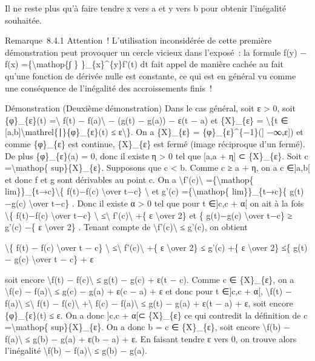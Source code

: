 \documentclass[]{article}
\begin{document}
Il ne reste plus qu'à faire tendre x vers a et y vers b pour obtenir
l'inégalité souhaitée.

Remarque~8.4.1 Attention~! L'utilisation inconsidérée de cette première
démonstration peut provoquer un cercle vicieux dans l'exposé~: la
formule f(y) − f(x) =\{\textbackslash{}mathop\{∫ \}
\}\_\{x\}\^{}\{y\}f'(t) dt fait appel de manière cachée au fait qu'une
fonction de dérivée nulle est constante, ce qui est en général vu comme
une conséquence de l'inégalité des accroissements finis~!

Démonstration (Deuxième démonstration) Dans le cas général, soit ε
\textgreater{} 0, soit \{φ\}\_\{ε\}(t) =\textbackslash{}\textbar{} f(t)
− f(a)\textbackslash{}\textbar{} − (g(t) − g(a)) − ε(t − a) et
\{X\}\_\{ε\} = \textbackslash{}\{t ∈
{[}a,b{]}\textbackslash{}mathrel\{∣\}\{φ\}\_\{ε\}(t) ≤
ε\textbackslash{}\}. On a \{X\}\_\{ε\} = \{φ\}\_\{ε\}\^{}\{−1\}({]}
−∞,ε{]}) et comme \{φ\}\_\{ε\} est continue, \{X\}\_\{ε\} est fermé
(image réciproque d'un fermé). De plus \{φ\}\_\{ε\}(a) = 0, donc il
existe η \textgreater{} 0 tel que {[}a,a + η{]} ⊂ \{X\}\_\{ε\}. Soit c
=\textbackslash{}mathop\{ sup\}\{X\}\_\{ε\}. Supposons que c \textless{}
b. Comme c ≥ a + η, on a c ∈{]}a,b{[} et donc f et g sont dérivables au
point c. On a \textbackslash{}\textbar{}f'(c)\textbackslash{}\textbar{}
=\{\textbackslash{}mathop\{ lim\}\}\_\{t→c\}\textbackslash{}\textbar{}\{
f(t)−f(c) \textbackslash{}over t−c\} \textbackslash{}\textbar{} et g'(c)
=\{\textbackslash{}mathop\{ lim\}\}\_\{t→c\}\{ g(t)−g(c)
\textbackslash{}over t−c\} . Donc il existe α \textgreater{} 0 tel que
pour t ∈{]}c,c + α{[} on ait à la fois \textbackslash{}\textbar{}\{
f(t)−f(c) \textbackslash{}over t−c\} \textbackslash{}\textbar{}
≤\textbackslash{}\textbar{} f'(c)\textbackslash{}\textbar{} +\{ ε
\textbackslash{}over 2\} et \{ g(t)−g(c) \textbackslash{}over t−c\} ≥
g'(c) −\{ ε \textbackslash{}over 2\} . Tenant compte de
\textbackslash{}\textbar{}f'(c)\textbackslash{}\textbar{} ≤ g'(c), on
obtient

\textbackslash{}\textbar{}\{ f(t) − f(c) \textbackslash{}over t − c\}
\textbackslash{}\textbar{} ≤\textbackslash{}\textbar{}
f'(c)\textbackslash{}\textbar{} +\{ ε \textbackslash{}over 2\} ≤ g'(c)
+\{ ε \textbackslash{}over 2\} ≤\{ g(t) − g(c) \textbackslash{}over t −
c\} + ε

soit encore \textbackslash{}\textbar{}f(t) −
f(c)\textbackslash{}\textbar{} ≤ g(t) − g(c) + ε(t − c). Comme c ∈
\{X\}\_\{ε\}, on a \textbackslash{}\textbar{}f(c) −
f(a)\textbackslash{}\textbar{} ≤ g(c) − g(a) + ε(c − a) + ε et donc pour
t ∈{]}c,c + α{[}, \textbackslash{}\textbar{}f(t) −
f(a)\textbackslash{}\textbar{} ≤\textbackslash{}\textbar{} f(t) −
f(c)\textbackslash{}\textbar{} +\textbackslash{}\textbar{} f(c) −
f(a)\textbackslash{}\textbar{} ≤ g(t) − g(a) + ε(t − a) + ε, soit encore
\{φ\}\_\{ε\}(t) ≤ ε. On a donc {]}c,c + α{[}⊂ \{X\}\_\{ε\} ce qui
contredit la définition de c =\textbackslash{}mathop\{
sup\}\{X\}\_\{ε\}. On a donc b = c ∈ \{X\}\_\{ε\}, soit encore
\textbackslash{}\textbar{}f(b) − f(a)\textbackslash{}\textbar{} ≤ g(b) −
g(a) + ε(b − a) + ε. En faisant tendre ε vers 0, on trouve alors
l'inégalité \textbackslash{}\textbar{}f(b) −
f(a)\textbackslash{}\textbar{} ≤ g(b) − g(a).
\end{document}
